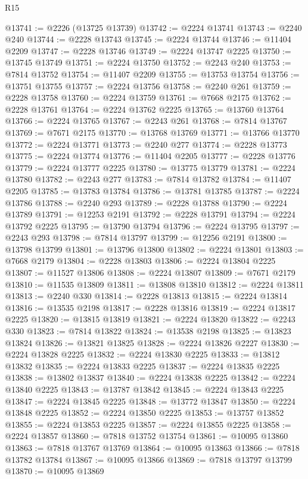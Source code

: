 \begin{lexlean}{R15}
\begin{coremodule}
@13741 := @2226 (@13725 @13739)
@13742 := @2224 @13741
@13743 := @2240 @240
@13744 := @2228 @13743
@13745 := @2224 @13744
@13746 := @11404 @2209
@13747 := @2228 @13746
@13749 := @2224 @13747 @2225
@13750 := @13745 @13749
@13751 := @2224 @13750
@13752 := @2243 @240
@13753 := @7814 @13752
@13754 := @11407 @2209
@13755 := @13753 @13754
@13756 := @13751 @13755
@13757 := @2224 @13756
@13758 := @2240 @261
@13759 := @2228 @13758
@13760 := @2224 @13759
@13761 := @7668 @2175
@13762 := @2228 @13761
@13764 := @2224 @13762 @2225
@13765 := @13760 @13764
@13766 := @2224 @13765
@13767 := @2243 @261
@13768 := @7814 @13767
@13769 := @7671 @2175
@13770 := @13768 @13769
@13771 := @13766 @13770
@13772 := @2224 @13771
@13773 := @2240 @277
@13774 := @2228 @13773
@13775 := @2224 @13774
@13776 := @11404 @2205
@13777 := @2228 @13776
@13779 := @2224 @13777 @2225
@13780 := @13775 @13779
@13781 := @2224 @13780
@13782 := @2243 @277
@13783 := @7814 @13782
@13784 := @11407 @2205
@13785 := @13783 @13784
@13786 := @13781 @13785
@13787 := @2224 @13786
@13788 := @2240 @293
@13789 := @2228 @13788
@13790 := @2224 @13789
@13791 := @12253 @2191
@13792 := @2228 @13791
@13794 := @2224 @13792 @2225
@13795 := @13790 @13794
@13796 := @2224 @13795
@13797 := @2243 @293
@13798 := @7814 @13797
@13799 := @12256 @2191
@13800 := @13798 @13799
@13801 := @13796 @13800
@13802 := @2224 @13801
@13803 := @7668 @2179
@13804 := @2228 @13803
@13806 := @2224 @13804 @2225
@13807 := @11527 @13806
@13808 := @2224 @13807
@13809 := @7671 @2179
@13810 := @11535 @13809
@13811 := @13808 @13810
@13812 := @2224 @13811
@13813 := @2240 @330
@13814 := @2228 @13813
@13815 := @2224 @13814
@13816 := @13535 @2198
@13817 := @2228 @13816
@13819 := @2224 @13817 @2225
@13820 := @13815 @13819
@13821 := @2224 @13820
@13822 := @2243 @330
@13823 := @7814 @13822
@13824 := @13538 @2198
@13825 := @13823 @13824
@13826 := @13821 @13825
@13828 := @2224 @13826 @2227
@13830 := @2224 @13828 @2225
@13832 := @2224 @13830 @2225
@13833 := @13812 @13832
@13835 := @2224 @13833 @2225
@13837 := @2224 @13835 @2225
@13838 := @13802 @13837
@13840 := @2224 @13838 @2225
@13842 := @2224 @13840 @2225
@13843 := @13787 @13842
@13845 := @2224 @13843 @2225
@13847 := @2224 @13845 @2225
@13848 := @13772 @13847
@13850 := @2224 @13848 @2225
@13852 := @2224 @13850 @2225
@13853 := @13757 @13852
@13855 := @2224 @13853 @2225
@13857 := @2224 @13855 @2225
@13858 := @2224 @13857
@13860 := @7818 @13752 @13754
@13861 := @10095 @13860
@13863 := @7818 @13767 @13769
@13864 := @10095 @13863
@13866 := @7818 @13782 @13784
@13867 := @10095 @13866
@13869 := @7818 @13797 @13799
@13870 := @10095 @13869

\end{coremodule}
\end{lexlean}
